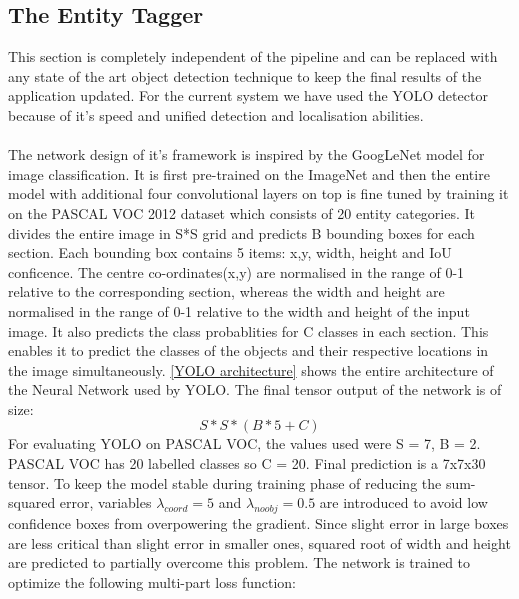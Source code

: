 \documentclass[conference]{IEEEtran}
\begin{document}
    \subsection{The Entity Tagger}
        This section is completely independent of the pipeline and can be replaced with any state of the art object detection technique to keep the final results of the application updated. For the current system we have used the YOLO detector because of it's speed and unified detection and localisation abilities. \\ \\
        The network design of it's framework is inspired by the GoogLeNet model for image classification. It is first pre-trained on the ImageNet and then the entire model with additional four convolutional layers on top is fine tuned by training it on the PASCAL VOC 2012 dataset which consists of 20 entity categories. It divides the entire image in S*S grid and predicts B bounding boxes for each section. Each bounding box contains 5 items: x,y, width, height and IoU conficence. The centre co-ordinates(x,y) are normalised in the range of 0-1 relative to the corresponding section, whereas the width and height are normalised in the range of 0-1 relative to the width and height of the input image. It also predicts the class probablities for C classes in each section. This enables it to predict the classes of the objects and their respective locations in the image simultaneously.
        \ref{YOLO architecture} shows the entire architecture of the Neural Network used by YOLO.
        The final tensor output of the network is of size: 
        \begin{equation}
            S * S * ( B * 5 + C )
        \end{equation}
        For evaluating YOLO on PASCAL VOC, the values used were S = 7, B = 2. PASCAL VOC has 20 labelled classes so C = 20. Final prediction is a 7x7x30 tensor. To keep the model stable during training phase of reducing the sum-squared error, variables 
        $ \lambda _{coord} = 5$ and $ \lambda_{noobj} = 0.5 $
        are introduced to avoid low confidence boxes from overpowering the gradient. Since slight error in large boxes are less critical than slight error in smaller ones, squared root of width and height are predicted to partially overcome this problem. The network is trained to optimize the following multi-part loss function: \\
\end{document}
